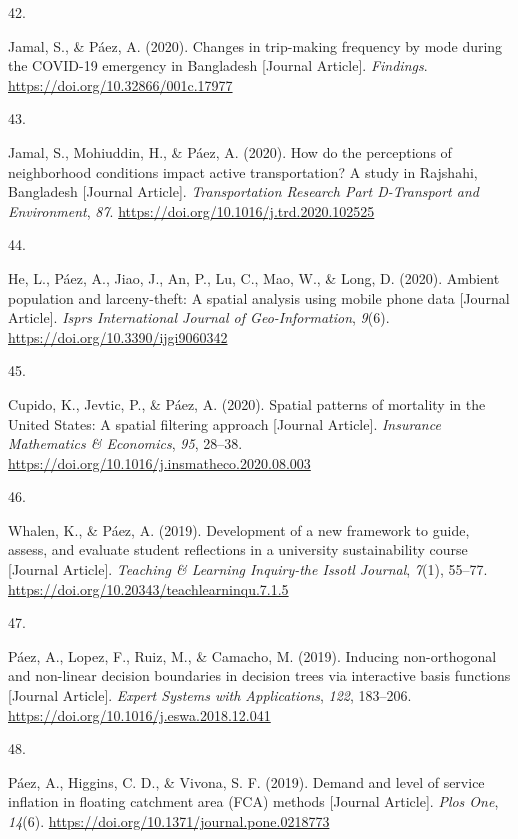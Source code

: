 \documentclass[11pt,a4paper,]{awesome-cv}
\newlength{\cslhangindent}
\newlength{\csllabelwidth}
\newenvironment{CSLReferences}[2] %
 {\begin{list}{}{%
  \setlength{\itemindent}{0pt}
  \setlength{\leftmargin}{0pt}
  \setlength{\parsep}{0pt}
  \ifodd #1
   \setlength{\leftmargin}{\cslhangindent}
   \setlength{\itemindent}{-1\cslhangindent}
  \fi
  \setlength{\itemsep}{#2\baselineskip}}}
 {\end{list}}
\newcommand{\CSLLeftMargin}[1]{\parbox[t]{\csllabelwidth}{\strut#1\strut}}
\newcommand{\CSLRightInline}[1]{\parbox[t]{\linewidth - \csllabelwidth}{\strut#1\strut}}
\begin{document}
\begin{CSLReferences}{0}{0}
\CSLLeftMargin{42. }%
\CSLRightInline{Jamal, S., \& Páez, A. (2020). Changes in trip-making
frequency by mode during the COVID-19 emergency in Bangladesh {[}Journal
Article{]}. \emph{Findings}. \url{https://doi.org/10.32866/001c.17977}}

\CSLLeftMargin{43. }%
\CSLRightInline{Jamal, S., Mohiuddin, H., \& Páez, A. (2020). How do the
perceptions of neighborhood conditions impact active transportation? A
study in Rajshahi, Bangladesh {[}Journal Article{]}.
\emph{Transportation Research Part D-Transport and Environment},
\emph{87}. \url{https://doi.org/10.1016/j.trd.2020.102525}}

\CSLLeftMargin{44. }%
\CSLRightInline{He, L., Páez, A., Jiao, J., An, P., Lu, C., Mao, W., \&
Long, D. (2020). Ambient population and larceny-theft: A spatial
analysis using mobile phone data {[}Journal Article{]}. \emph{Isprs
International Journal of Geo-Information}, \emph{9}(6).
\url{https://doi.org/10.3390/ijgi9060342}}

\CSLLeftMargin{45. }%
\CSLRightInline{Cupido, K., Jevtic, P., \& Páez, A. (2020). Spatial
patterns of mortality in the United States: A spatial filtering approach
{[}Journal Article{]}. \emph{Insurance Mathematics \& Economics},
\emph{95}, 28--38.
\url{https://doi.org/10.1016/j.insmatheco.2020.08.003}}

\CSLLeftMargin{46. }%
\CSLRightInline{Whalen, K., \& Páez, A. (2019). Development of a new
framework to guide, assess, and evaluate student reflections in a
university sustainability course {[}Journal Article{]}. \emph{Teaching
\& Learning Inquiry-the Issotl Journal}, \emph{7}(1), 55--77.
\url{https://doi.org/10.20343/teachlearninqu.7.1.5}}

\CSLLeftMargin{47. }%
\CSLRightInline{Páez, A., Lopez, F., Ruiz, M., \& Camacho, M. (2019).
Inducing non-orthogonal and non-linear decision boundaries in decision
trees via interactive basis functions {[}Journal Article{]}.
\emph{Expert Systems with Applications}, \emph{122}, 183--206.
\url{https://doi.org/10.1016/j.eswa.2018.12.041}}

\CSLLeftMargin{48. }%
\CSLRightInline{Páez, A., Higgins, C. D., \& Vivona, S. F. (2019).
Demand and level of service inflation in floating catchment area (FCA)
methods {[}Journal Article{]}. \emph{Plos One}, \emph{14}(6).
\url{https://doi.org/10.1371/journal.pone.0218773}}


\end{CSLReferences}
\end{document}
